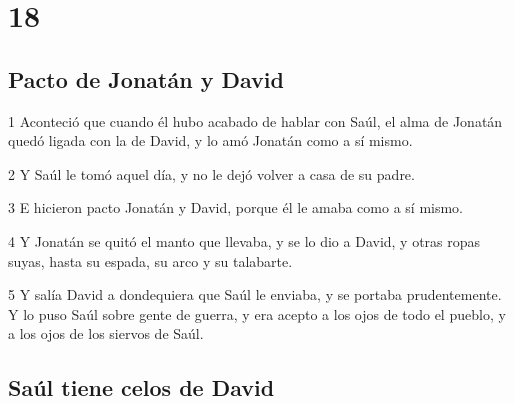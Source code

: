 \chapter{18}

\section*{Pacto de Jonatán y David}

\par 1 Aconteció que cuando él hubo acabado de hablar con Saúl, el alma de Jonatán quedó ligada con la de David, y lo amó Jonatán como a sí mismo.
\par 2 Y Saúl le tomó aquel día, y no le dejó volver a casa de su padre.
\par 3 E hicieron pacto Jonatán y David, porque él le amaba como a sí mismo.
\par 4 Y Jonatán se quitó el manto que llevaba, y se lo dio a David, y otras ropas suyas, hasta su espada, su arco y su talabarte.
\par 5 Y salía David a dondequiera que Saúl le enviaba, y se portaba prudentemente. Y lo puso Saúl sobre gente de guerra, y era acepto a los ojos de todo el pueblo, y a los ojos de los siervos de Saúl.

\section*{Saúl tiene celos de David}

